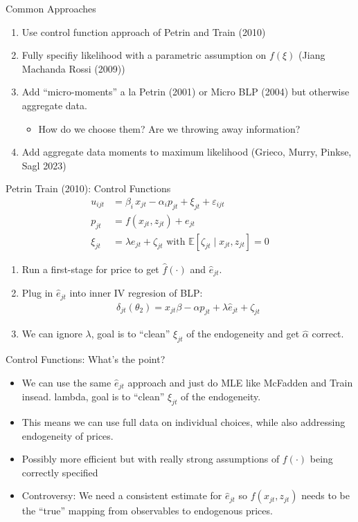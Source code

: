 \begin{frame}{Common Approaches}
\begin{enumerate}
\item Use control function approach of Petrin and Train (2010)
\item Fully specifiy likelihood with a parametric assumption on $f(\xi)$ (Jiang Machanda Rossi (2009))
\item Add ``micro-moments'' a la Petrin (2001) or Micro BLP (2004) but otherwise aggregate data.
\begin{itemize}
\item How do we choose them? Are we throwing away information?
\end{itemize}
\item Add aggregate data moments to maximum likelihood (Grieco, Murry, Pinkse, Sagl 2023)
\end{enumerate}
\end{frame}


\begin{frame}{Petrin Train (2010): Control Functions}
\begin{align*}
u_{ijt} &=  \beta_i\, x_{jt} - \alpha_i p_{jt} + \xi_{jt} + \varepsilon_{ijt} \\
p_{jt} &= f(x_{jt}, z_{jt}) + e_{jt}\\
\xi_{jt} &= \lambda e_{jt} + \zeta_{jt}  \text{ with } \mathbb{E}[\zeta_{jt} \mid  x_{jt}, z_{jt}]=0 
\end{align*}
\begin{enumerate}
\item Run a first-stage for price to get $\hat{f}(\cdot)$ and $\hat{e}_{jt}$.
\item Plug in $\hat{e}_{jt}$ into inner IV regresion of BLP:
\begin{align*}
\delta_{jt}(\theta_2) = x_{jt} \beta -\alpha p_{jt}+ \lambda \hat{e}_{jt} + \zeta_{jt}
 \end{align*}
 \item We can ignore $\lambda$, goal is to ``clean'' $\xi_{jt}$ of the endogeneity and get $\widehat{\alpha}$ correct.
\end{enumerate}
\end{frame}


\begin{frame}{Control Functions: What's the point?}
\begin{itemize}
\item We can use the same $\hat{e}_{jt}$ approach and just do MLE like McFadden and Train insead.
lambda, goal is to ``clean'' $\xi_{jt}$ of the endogeneity.
\item This means we can use full data on individual choices, while also addressing endogeneity of prices.
\item Possibly more efficient but with really strong assumptions of $f(\cdot)$ being correctly specified
\item Controversy: We need a consistent estimate for $\hat{e}_{jt}$ so $f(x_{jt}, z_{jt})$ needs to be the ``true'' mapping from observables to endogenous prices.
\end{itemize}
\end{frame}


